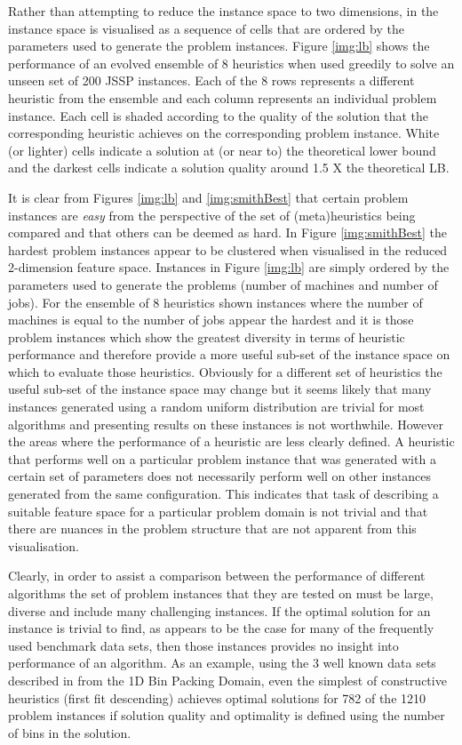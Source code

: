 \documentclass[a4paper]{article}
\begin{document}
Rather than attempting to reduce the instance space to two dimensions, in \cite{Hart2015underReview} the instance space is visualised as a sequence of cells that are ordered by the parameters used to generate the problem instances. Figure \ref{img:lb} shows the performance of an evolved ensemble of 8 heuristics when used greedily to solve an unseen set of 200 JSSP instances. Each of the 8 rows represents a different  heuristic from the ensemble and each column represents an individual problem instance. Each cell is shaded according to the quality of the solution that the corresponding heuristic achieves on the corresponding problem instance. White (or lighter) cells indicate a solution at (or near to) the theoretical lower bound and the darkest cells indicate a solution quality around 1.5 X the theoretical LB.

It is clear from Figures \ref{img:lb} and \ref{img:smithBest} that certain problem instances are \emph{easy} from the perspective of the set of (meta)heuristics being compared and that others can be deemed as hard. In Figure  \ref{img:smithBest} the hardest problem instances appear to be clustered when visualised in the reduced 2-dimension feature space.
Instances in Figure \ref{img:lb} are simply ordered by the parameters used to generate the problems (number of machines and number of jobs). For the ensemble of 8 heuristics shown instances where the number of machines is equal to the number of jobs appear the hardest and it is those problem instances which show the greatest diversity in terms of heuristic performance and therefore provide a more useful sub-set of the instance space on which to evaluate those heuristics. Obviously for a different set of heuristics the useful sub-set of the instance space may change but it seems likely that many instances generated using a random uniform distribution are trivial for most algorithms and presenting results on these instances is not worthwhile.
However the areas where the performance of a heuristic are less clearly defined. A heuristic that performs well on a particular problem instance that was generated with a certain set of parameters does not necessarily perform well on other instances generated from the same configuration. This indicates that task of describing a suitable feature space for a particular problem domain is not trivial and that there are nuances in the problem structure that are not apparent from this visualisation.

Clearly, in order to assist a comparison between the performance of different algorithms the set of problem instances that they are tested on must be large, diverse and include many challenging instances. If the optimal solution for an instance is trivial to find, as appears to be the case for many of the frequently used benchmark data sets, then those instances provides no insight into performance of an algorithm. 
As an example, using the 3 well known data sets described in \cite{Scholl209} from the 1D Bin Packing Domain, even the simplest of constructive heuristics (first fit descending) achieves optimal solutions for 782 of the 1210 problem instances if solution quality and optimality is defined using the number of bins in the solution.
\end{document}
